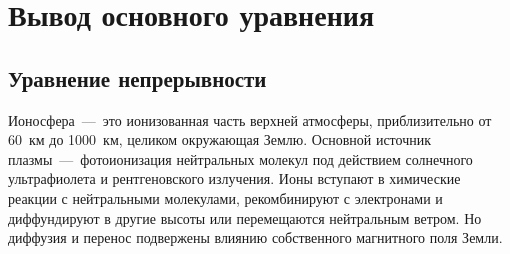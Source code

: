 \documentclass[14pt, a4paper, fleqn, twoside]{extreport}
\theoremstyle{definiton}
\theoremstyle{definition}
\begin{document}












\newpage

\setcounter{page}{2}



\newpage


\section*{Вывод основного уравнения}

\subsection*{Уравнение непрерывности}

Ионосфера~---~это ионизованная часть верхней атмосферы, приблизительно от 60~км до 1000~км, целиком окружающая Землю. Основной источник плазмы~---~фотоионизация нейтральных молекул под действием солнечного ультрафиолета и рентгеновского излучения. Ионы вступают в химические реакции с нейтральными молекулами, рекомбинируют с электронами и диффундируют в другие высоты или перемещаются нейтральным ветром. Но диффузия и перенос подвержены влиянию собственного магнитного поля Земли.
\end{document}
